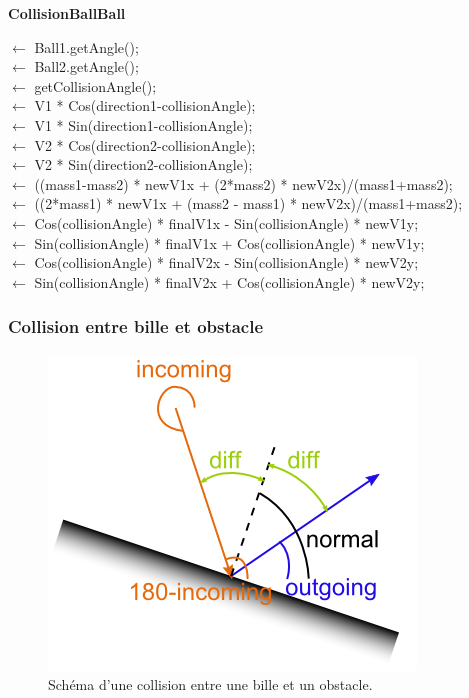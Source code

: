\documentclass{report}
\begin{document}
\begin{algorithm}[h]
    \caption{{\bf CollisionBallBall} \label{CollisionBallBall}}
    \(\leftarrow\) Ball1.getAngle();\\
    \(\leftarrow\) Ball2.getAngle();\\
    \(\leftarrow\) getCollisionAngle();\\
    \(\leftarrow\) V1 * Cos(direction1-collisionAngle);\\ 
    \(\leftarrow\) V1 * Sin(direction1-collisionAngle);\\
    \(\leftarrow\) V2 * Cos(direction2-collisionAngle);\\ 
    \(\leftarrow\) V2 * Sin(direction2-collisionAngle);\\
    \(\leftarrow\) ((mass1-mass2) * newV1x + (2*mass2) * newV2x)/(mass1+mass2);\\ 
    \(\leftarrow\) ((2*mass1) * newV1x + (mass2 - mass1) * newV2x)/(mass1+mass2);\\
    \(\leftarrow\) Cos(collisionAngle) * finalV1x - Sin(collisionAngle) * newV1y;\\
    \(\leftarrow\) Sin(collisionAngle) * finalV1x + Cos(collisionAngle) * newV1y;\\
    \(\leftarrow\) Cos(collisionAngle) * finalV2x - Sin(collisionAngle) * newV2y;\\
    \(\leftarrow\) Sin(collisionAngle) * finalV2x + Cos(collisionAngle) * newV2y;
\end{algorithm}

\clearpage

\subsubsection{Collision entre bille et obstacle}

\begin{figure}[H]
\centering
\includegraphics[scale=1]{collision_bille_obstacle.png}
\caption{Schéma d'une collision entre une bille et un obstacle. \cite{05}}
\end{figure}
\end{document}
